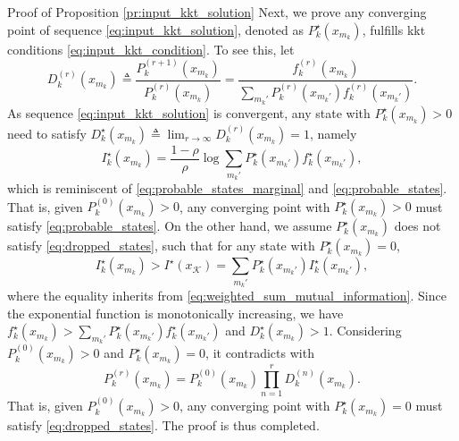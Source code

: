 \documentclass[journal]{IEEEtran}
\begin{document}
\begin{appendix}
\begin{subsection}{Proof of Proposition \ref{pr:input_kkt_solution}}
		Next, we prove any converging point of sequence \eqref{eq:input_kkt_solution}, denoted as $P_k^\star(x_{m_k})$, fulfills \gls{kkt} conditions \eqref{eq:input_kkt_condition}.
		To see this, let
		\begin{equation}
			D_k^{(r)}(x_{m_k}) \triangleq \frac{P_k^{(r+1)}(x_{m_k})}{P_k^{(r)}(x_{m_k})} = \frac{f_k^{(r)}(x_{m_k})}{\sum_{m_k'} P_k^{(r)}(x_{m_k'}) f_k^{(r)}(x_{m_k'})}.
		\end{equation}
		As sequence \eqref{eq:input_kkt_solution} is convergent, any state with $P_k^\star(x_{m_k}) > 0$ need to satisfy $D_k^\star(x_{m_k}) \triangleq \lim_{r \to \infty} D_k^{(r)}(x_{m_k}) = 1$, namely
		\begin{equation}
			I_k^\star(x_{m_k}) = \frac{1 - \rho}{\rho} \log \sum_{m_k'} P_k^\star(x_{m_k'}) f_k^\star(x_{m_k'}),
		\end{equation}
		which is reminiscent of \eqref{eq:probable_states_marginal} and \eqref{eq:probable_states}.
		That is, given $P_k^{(0)}(x_{m_k}) > 0$, any converging point with $P_k^\star(x_{m_k}) > 0$ must satisfy \eqref{eq:probable_states}.
		On the other hand, we assume $P_k^\star(x_{m_k})$ does not satisfy \eqref{eq:dropped_states}, such that for any state with $P_k^\star(x_{m_k}) = 0$,
		\begin{equation}
			I_k^\star(x_{m_k}) > I^\star(x_{\mathcal{K}}) = \sum_{m_k'} P_k^\star(x_{m_k'}) I_k^\star(x_{m_k'}),
		\end{equation}
		where the equality inherits from \eqref{eq:weighted_sum_mutual_information}.
		Since the exponential function is monotonically increasing, we have $f_k^\star(x_{m_k}) > \sum_{m_k'} P_k^\star(x_{m_k'}) f_k^\star(x_{m_k'})$ and $D_k^\star(x_{m_k}) > 1$.
		Considering $P_k^{(0)}(x_{m_k}) > 0$ and $P_k^\star(x_{m_k}) = 0$, it contradicts with
		\begin{equation}
			P_k^{(r)}(x_{m_k}) = P_k^{(0)}(x_{m_k}) \prod_{n=1}^r D_k^{(n)}(x_{m_k}).
		\end{equation}
		That is, given $P_k^{(0)}(x_{m_k}) > 0$, any converging point with $P_k^\star(x_{m_k}) = 0$ must satisfy \eqref{eq:dropped_states}.
		The proof is thus completed.
		\label{ap:input_kkt_solution}
	\end{subsection}



\end{appendix}
\end{document}
